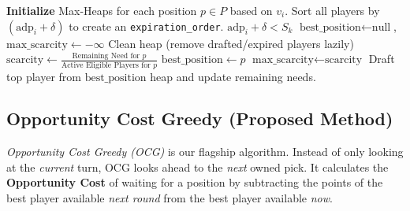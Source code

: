 \documentclass[11pt,a4paper]{article}
\begin{document}
\begin{algorithm}[H]
\caption{Direct Greedy (DG)}
\begin{algorithmic}[1]
\State \textbf{Initialize} Max-Heaps for each position $p \in P$ based on $v_i$.
\State Sort all players by $(\text{adp}_i + \delta)$ to create an \texttt{expiration\_order}.
    \State {} $\text{adp}_i + \delta < S_k$
    \State $\text{best\_position} \leftarrow \text{null}$, $\text{max\_scarcity} \leftarrow -\infty$
        \State Clean heap (remove drafted/expired players lazily)
        \State $\text{scarcity} \leftarrow \frac{\text{Remaining Need for } p}{\text{Active Eligible Players for } p}$
            \State $\text{best\_position} \leftarrow p$
            \State $\text{max\_scarcity} \leftarrow \text{scarcity}$
        \EndIf
    \EndFor
    \State Draft top player from $\text{best\_position}$ heap and update remaining needs.
\EndFor
\end{algorithmic}
\end{algorithm}

\subsection{Opportunity Cost Greedy (Proposed Method)}
\emph{Opportunity Cost Greedy (OCG)} is our flagship algorithm. Instead of only looking at the \textit{current} turn, OCG looks ahead to the \textit{next} owned pick. It calculates the \textbf{Opportunity Cost} of waiting for a position by subtracting the points of the best player available \textit{next round} from the best player available \textit{now}.
\end{document}
